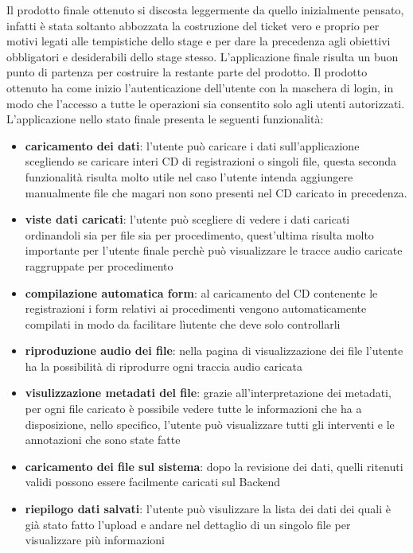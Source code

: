 Il prodotto finale ottenuto si discosta leggermente da quello inizialmente pensato, infatti è stata soltanto abbozzata la costruzione del ticket vero e proprio per motivi legati alle tempistiche dello stage
e per dare la precedenza agli obiettivi obbligatori e desiderabili dello stage stesso. L'applicazione finale risulta un buon punto di partenza per costruire la restante parte del prodotto.
Il prodotto ottenuto ha come inizio l'autenticazione dell'utente con la maschera di login, in modo che l'accesso a tutte le operazioni sia consentito solo agli utenti autorizzati.
L'applicazione nello stato finale presenta le seguenti funzionalità:
\begin{itemize}
  \item \textbf{caricamento dei dati}: l'utente può caricare i dati sull'applicazione scegliendo se caricare interi CD di registrazioni o singoli file, questa seconda funzionalità risulta molto utile nel caso
        l'utente intenda aggiungere manualmente file che magari non sono presenti nel CD caricato in precedenza.
  \item \textbf{viste dati caricati}: l'utente può scegliere di vedere i dati caricati ordinandoli sia per file sia per procedimento, quest'ultima risulta molto importante per l'utente finale perchè
        può visualizzare le tracce audio caricate raggruppate per procedimento
  \item \textbf{compilazione automatica form}: al caricamento del CD contenente le registrazioni i form relativi ai procedimenti vengono automaticamente compilati in modo da facilitare lìutente che deve solo controllarli
  \item \textbf{riproduzione audio dei file}: nella pagina di visualizzazione dei file l'utente ha la possibilità di riprodurre ogni traccia audio caricata
  \item \textbf{visulizzazione metadati del file}: grazie all'interpretazione dei metadati, per ogni file caricato è possibile vedere tutte le informazioni che ha a disposizione, nello specifico, l'utente può visualizzare tutti gli interventi e le annotazioni che sono state fatte
  \item \textbf{caricamento dei file sul sistema}: dopo la revisione dei dati, quelli ritenuti validi possono essere facilmente caricati sul Backend
  \item \textbf{riepilogo dati salvati}: l'utente può visulizzare la lista dei dati dei quali è già stato fatto l'upload e andare nel dettaglio di un singolo file per visualizzare più informazioni
\end{itemize}


